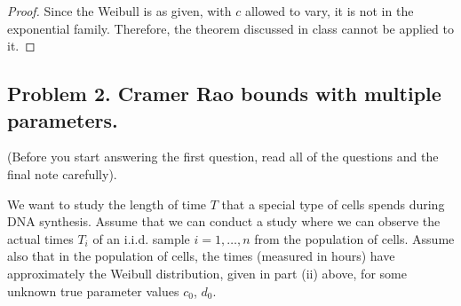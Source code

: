 \documentclass[letterpaper, 12pt]{article}
\begin{document}
\begin{enumerate}[(a)]
\begin{enumerate}[(i)]
\begin{proof}
Since the Weibull is as given, with $c$ allowed to vary, it is not in the exponential family. Therefore, the theorem discussed in class cannot be applied to it.
\end{proof}
\end{enumerate}
\end{enumerate}

\subsection*{Problem 2. Cramer Rao bounds with multiple parameters.}
(Before you start answering the ﬁrst question, read all of the questions and the ﬁnal note carefully).

We want to study the length of time $T$ that a special type of cells spends during DNA synthesis. Assume
that we can conduct a study where we can observe the actual times $T_i$ of an i.i.d. sample $i = 1, \dots, n$ from
the population of cells. Assume also that in the population of cells, the times (measured in hours) have
approximately the Weibull distribution, given in part (ii) above, for some unknown true parameter values
$c_0$, $d_0$.
\end{document}
